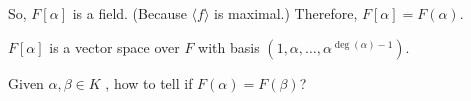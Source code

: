 \begin{cor}
	So, $F[\alpha]$ is a field. (Because $ \langle f \rangle$ is maximal.) Therefore, $F[\alpha] = F(\alpha)$.
\end{cor}

\begin{prop}
	$F[\alpha]$ is a vector space over $F$ with basis $(1, \alpha, \dots, \alpha^{\deg(\alpha) - 1})$.
\end{prop}

\begin{prob}
	Given $\alpha, \beta \in K$ , how to tell if $F(\alpha) = F(\beta)$?
\end{prob}
